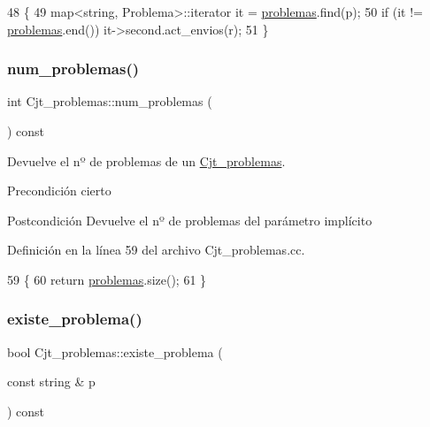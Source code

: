 \begin{DoxyCode}
48                                                           \{
49       map<string, Problema>::iterator it = \mbox{\hyperlink{class_cjt__problemas_aad49222fb63517d7d7fc3d691f045cc5}{problemas}}.find(p);
50       \textcolor{keywordflow}{if} (it != \mbox{\hyperlink{class_cjt__problemas_aad49222fb63517d7d7fc3d691f045cc5}{problemas}}.end()) it->second.act\_envios(r);
51     \}
\end{DoxyCode}
\mbox{\label{class_cjt__problemas_aa713f6541f4d9b67497f047806a8374e}} 
\subsubsection{\texorpdfstring{num\+\_\+problemas()}{num\_problemas()}}
{\footnotesize\ttfamily int Cjt\+\_\+problemas\+::num\+\_\+problemas (\begin{DoxyParamCaption}{ }\end{DoxyParamCaption}) const}



Devuelve el nº de problemas de un \mbox{\hyperlink{class_cjt__problemas}{Cjt\+\_\+problemas}}. 

\begin{DoxyPrecond}{Precondición}
cierto 
\end{DoxyPrecond}
\begin{DoxyPostcond}{Postcondición}
Devuelve el nº de problemas del parámetro implícito 
\end{DoxyPostcond}


Definición en la línea 59 del archivo Cjt\+\_\+problemas.\+cc.


\begin{DoxyCode}
59                                            \{
60       \textcolor{keywordflow}{return} \mbox{\hyperlink{class_cjt__problemas_aad49222fb63517d7d7fc3d691f045cc5}{problemas}}.size();
61     \}
\end{DoxyCode}
\mbox{\label{class_cjt__problemas_a90b230192705dd6f2e15fb10514a5814}} 
\subsubsection{\texorpdfstring{existe\+\_\+problema()}{existe\_problema()}}
{\footnotesize\ttfamily bool Cjt\+\_\+problemas\+::existe\+\_\+problema (\begin{DoxyParamCaption}\item[{const string \&}]{p }\end{DoxyParamCaption}) const}



